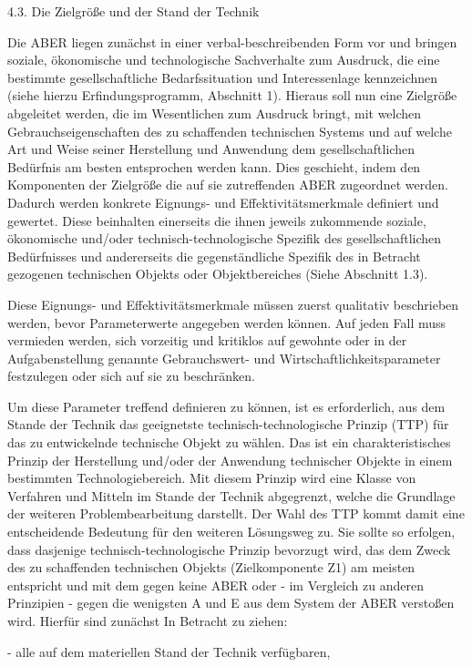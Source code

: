 \documentclass[12pt,a4paper]{article}
\begin{document}
4.3. Die Zielgröße und der Stand der Technik

Die ABER liegen zunächst in einer verbal-beschreibenden Form vor und bringen soziale, ökonomische und technologische Sachverhalte zum Ausdruck, die eine bestimmte gesellschaftliche Bedarfssituation und Interessenlage kennzeichnen (siehe hierzu Erfindungsprogramm, Abschnitt 1). Hieraus soll nun eine Zielgröße abgeleitet werden, die im Wesentlichen zum Ausdruck bringt, mit welchen Gebrauchseigenschaften des zu schaffenden technischen Systems und auf welche Art und Weise seiner Herstellung und Anwendung dem gesellschaftlichen Bedürfnis am besten entsprochen werden kann. Dies geschieht, indem den Komponenten der Zielgröße die auf sie zutreffenden ABER zugeordnet werden. Dadurch werden konkrete Eignungs- und Effektivitätsmerkmale definiert und gewertet. Diese beinhalten einerseits die ihnen jeweils zukommende soziale, ökonomische und/oder technisch-technologische Spezifik des gesellschaftlichen Bedürfnisses und andererseits die gegenständliche Spezifik des in Betracht gezogenen technischen Objekts oder Objektbereiches (Siehe Abschnitt 1.3).

Diese Eignungs- und Effektivitätsmerkmale müssen zuerst qualitativ beschrieben werden, bevor Parameterwerte angegeben werden können. Auf jeden Fall muss vermieden werden, sich vorzeitig und kritiklos auf gewohnte oder in der Aufgabenstellung genannte Gebrauchswert- und Wirtschaftlichkeitsparameter festzulegen oder sich auf sie zu beschränken.

Um diese Parameter treffend definieren zu können, ist es erforderlich, aus dem Stande der Technik das geeignetste technisch-technologische Prinzip (TTP) für das zu entwickelnde technische Objekt zu wählen. Das ist ein charakteristisches Prinzip der Herstellung und/oder der Anwendung technischer Objekte in einem bestimmten Technologiebereich. Mit diesem Prinzip wird eine Klasse von Verfahren und Mitteln im Stande der Technik abgegrenzt, welche die Grundlage der weiteren Problembearbeitung darstellt. Der Wahl des TTP kommt damit eine entscheidende Bedeutung für den weiteren Lösungsweg zu. Sie sollte so erfolgen, dass dasjenige technisch-technologische Prinzip bevorzugt wird, das dem Zweck des zu schaffenden technischen Objekts (Zielkomponente Z1) am meisten entspricht und mit dem gegen keine ABER oder - im Vergleich zu anderen Prinzipien - gegen die wenigsten A und E aus dem System der ABER verstoßen wird. Hierfür sind zunächst In Betracht zu ziehen:

- alle auf dem materiellen Stand der Technik verfügbaren,
\end{document}
